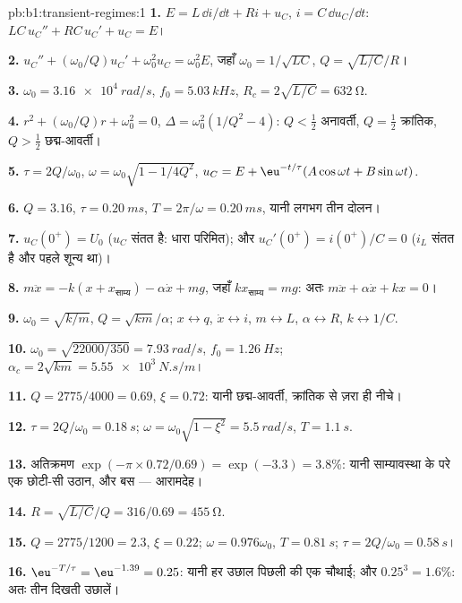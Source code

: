 \begin{solution}{pb:b1:transient-regimes:1}
\textbf{1.} $E = L\,\dd i/\dd t + Ri + u_C$, $i = C\,\dd u_C/\dd t$:
$LC\,u_C'' + RC\,u_C' + u_C = E$।

\textbf{2.} $u_C'' + (\omega_0/Q)u_C' + \omega_0^2u_C = \omega_0^2E$, जहाँ
$\omega_0 = 1/\sqrt{LC}$, $Q = \sqrt{L/C}/R$।

\textbf{3.} $\omega_0 = \qty{3.16e4}{rad/s}$, $f_0 = \qty{5.03}{kHz}$,
$R_c = 2\sqrt{L/C} = \qty{632}{\ohm}$.

\textbf{4.} $r^2 + (\omega_0/Q)r + \omega_0^2 = 0$, $\Delta = \omega_0^2(1/Q^2
- 4)$: $Q < \tfrac12$ अनावर्ती, $Q = \tfrac12$ क्रांतिक, $Q > \tfrac12$
छद्म-आवर्ती।

\textbf{5.} $\tau = 2Q/\omega_0$, $\omega = \omega_0\sqrt{1 - 1/4Q^2}$,
$u_C = E + \eu^{-t/\tau}(A\cos\omega t + B\sin\omega t)$.

\textbf{6.} $Q = 3.16$, $\tau = \qty{0.20}{ms}$, $T = 2\pi/\omega =
\qty{0.20}{ms}$, यानी लगभग तीन दोलन।

\textbf{7.} $u_C(0^+) = U_0$ ($u_C$ संतत है: धारा परिमित); और
$u_C'(0^+) = i(0^+)/C = 0$ ($i_L$ संतत है और पहले शून्य था)।

\textbf{8.} $m\ddot x = -k(x + x_{\text{साम्य}}) - \alpha\dot x + mg$, जहाँ
$kx_{\text{साम्य}} = mg$: अतः $m\ddot x + \alpha\dot x + kx = 0$।

\textbf{9.} $\omega_0 = \sqrt{k/m}$, $Q = \sqrt{km}/\alpha$; $x \leftrightarrow
q$, $\dot x \leftrightarrow i$, $m \leftrightarrow L$, $\alpha \leftrightarrow
R$, $k \leftrightarrow 1/C$.

\textbf{10.} $\omega_0 = \sqrt{22000/350} = \qty{7.93}{rad/s}$, $f_0 =
\qty{1.26}{Hz}$; $\alpha_c = 2\sqrt{km} = \qty{5.55e3}{N.s/m}$।

\textbf{11.} $Q = 2775/4000 = 0.69$, $\xi = 0.72$: यानी छद्म-आवर्ती, क्रांतिक
से ज़रा ही नीचे।

\textbf{12.} $\tau = 2Q/\omega_0 = \qty{0.18}{s}$; $\omega = \omega_0\sqrt{1
- \xi^2} = \qty{5.5}{rad/s}$, $T = \qty{1.1}{s}$.

\textbf{13.} अतिक्रमण $\exp(-\pi \times 0.72/0.69) = \exp(-3.3) = 3.8\%$:
यानी साम्यावस्था के परे एक छोटी-सी उठान, और बस --- आरामदेह।

\textbf{14.} $R = \sqrt{L/C}/Q = 316/0.69 = \qty{455}{\ohm}$.

\textbf{15.} $Q = 2775/1200 = 2.3$, $\xi = 0.22$; $\omega = 0.976\omega_0$,
$T = \qty{0.81}{s}$; $\tau = 2Q/\omega_0 = \qty{0.58}{s}$।

\textbf{16.} $\eu^{-T/\tau} = \eu^{-1.39} = 0.25$: यानी हर उछाल पिछली की
एक चौथाई; और $0.25^3 = 1.6\%$: अतः तीन दिखती उछालें।


\end{solution}
